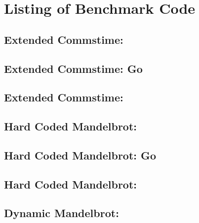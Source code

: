 

\chapter{Listing of Benchmark Code}
\label{ch:benchmark_code}

\section*{Extended Commstime: \Proxc{}}


\section*{Extended Commstime: Go}


\section*{Extended Commstime: \Cppcsp{}}


\section*{Hard Coded Mandelbrot: \Proxc{}}


\section*{Hard Coded Mandelbrot: Go}


\section*{Hard Coded Mandelbrot: \Cppcsp{}}



\section*{Dynamic Mandelbrot: \Proxc{}}


